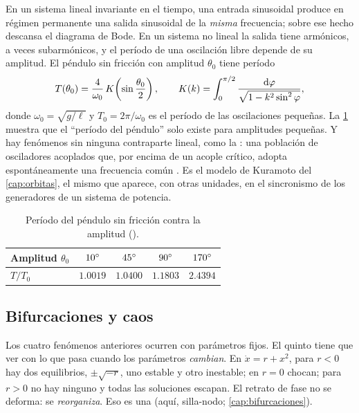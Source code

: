 En un sistema lineal invariante en el tiempo, una entrada sinusoidal produce en régimen permanente una salida sinusoidal de la \emph{misma} frecuencia; sobre ese hecho descansa el diagrama de Bode. En un sistema no lineal la salida tiene armónicos, a veces subarmónicos, y el período de una oscilación libre depende de su amplitud. El péndulo sin fricción con amplitud $\theta_0$ tiene período
\[
  T(\theta_0)=\frac{4}{\omega_0}\,K\!\left(\sin\frac{\theta_0}{2}\right),\qquad K(k)=\int_0^{\pi/2}\frac{\mathrm{d}\varphi}{\sqrt{1-k^2\sin^2\varphi}},
\]
donde $\omega_0=\sqrt{g/\ell}$ y $T_0=2\pi/\omega_0$ es el período de las oscilaciones pequeñas. La \cref{tab:in-periodo} muestra que el ``período del péndulo'' solo existe para amplitudes pequeñas. Y hay fenómenos sin ninguna contraparte lineal, como la : una población de osciladores acoplados que, por encima de un acople crítico, adopta espontáneamente una frecuencia común \citep{Kur75}. Es el modelo de Kuramoto del \cref{cap:orbitas}, el mismo que aparece, con otras unidades, en el sincronismo de los generadores de un sistema de potencia.

\begin{table}[ht]
\centering
\begin{tabular}{@{}lcccc@{}}
\toprule
Amplitud $\theta_0$ & $10^{\circ}$ & $45^{\circ}$ & $90^{\circ}$ & $170^{\circ}$\\
\midrule
$T/T_0$ & $1.0019$ & $1.0400$ & $1.1803$ & $2.4394$\\
\bottomrule
\end{tabular}
\caption{Período del péndulo sin fricción contra la amplitud ().}
\label{tab:in-periodo}
\end{table}


\subsection{Bifurcaciones y caos}

Los cuatro fenómenos anteriores ocurren con parámetros fijos. El quinto tiene que ver con lo que pasa cuando los parámetros \emph{cambian}. En $\dot x=r+x^2$, para $r<0$ hay dos equilibrios, $\pm\sqrt{-r}$, uno estable y otro inestable; en $r=0$ chocan; para $r>0$ no hay ninguno y todas las soluciones escapan. El retrato de fase no se deforma: se \emph{reorganiza}. Eso es una  (aquí, silla-nodo; \cref{cap:bifurcaciones}).

